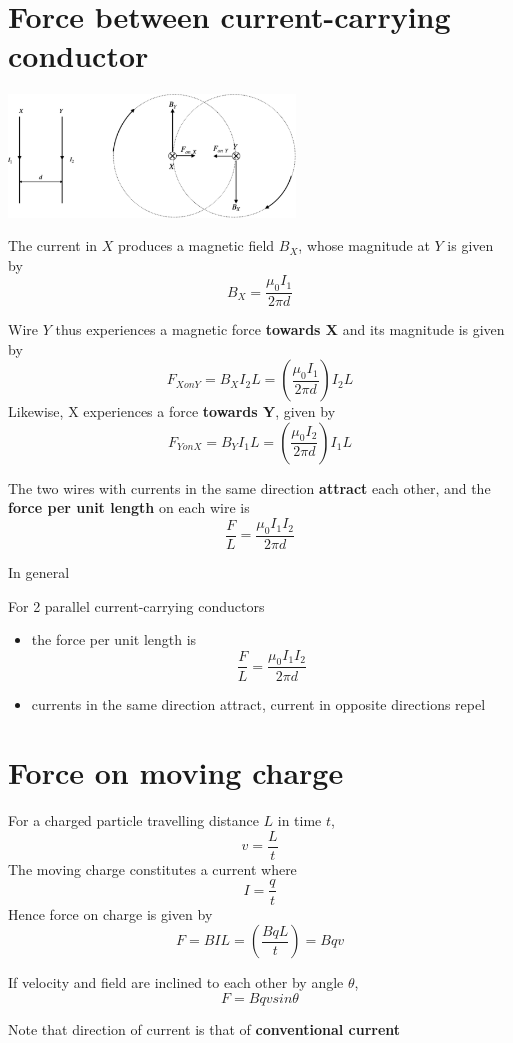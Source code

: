 \documentclass[a4paper, 10pt]{article}
\begin{document}
\section{Force between current-carrying conductor}

\begin{center}
   \includegraphics[width=3in]{figures/7.pdf} 
\end{center}	

The current in $X$ produces a magnetic field $B_X$, whose magnitude at $Y$ is given by
\[
   B_X = \frac{\mu_0 I_1}{2\pi d}
\]

Wire $Y$  thus experiences a magnetic force \textbf{towards X} and its magnitude is given by
\[
   F_{X on Y} = B_X I_2 L = \left( \frac{\mu_0 I_1}{2 \pi d} \right) I_2 L
\]
Likewise, X experiences a force \textbf{towards Y}, given by
\[
   F_{Y on X} = B_Y I_1 L = \left( \frac{\mu_0 I_2}{2 \pi d} \right) I_1 L
\]

The two wires with currents in the same direction \textbf{attract} each other, and the \textbf{force per unit length} on each wire is
\[
\frac{ F}{L} = \frac{\mu_0 I_1 I_2}{2 \pi d}
\]

In general
\begin{framed}
   For 2 parallel current-carrying conductors
   \begin{itemize}
      \item the force per unit length is 
         \[
         \frac{F}{L} = \frac{\mu_0 I_1 I_2}{2 \pi d}
         \]
      \item currents in the same direction attract, current in opposite directions repel
   \end{itemize}	
\end{framed}	

\section{Force on moving charge}

\begin{framed}
   For a charged particle travelling distance $L$ in time $t$, 
   \[
   v = \frac{L}{t}
   \]
   The moving charge constitutes a current where 
   \[
      I = \frac{q}{t}
   \]
   Hence force on charge is given by 
   \[
      F = BIL = \left( \frac{BqL}{t} \right) = Bqv
   \]

   If velocity and field are inclined to each other by angle $\theta$, 
   \[
   F = Bqv sin \theta
   \]

   Note that direction of current is that of \textbf{conventional current}
\end{framed}	
\end{document}
